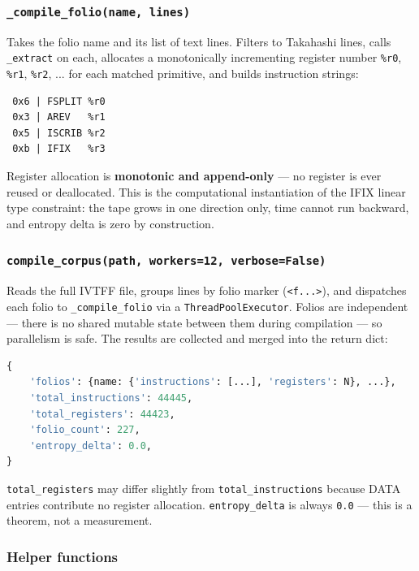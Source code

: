 \documentclass[12pt,a4paper]{article}
\begin{document}
\subsubsection{\texttt{\_compile\_folio(name, lines)}}

Takes the folio name and its list of text lines. Filters to Takahashi lines, calls \texttt{\_extract} on each, allocates a monotonically incrementing register number \texttt{\%r0}, \texttt{\%r1}, \texttt{\%r2}, ... for each matched primitive, and builds instruction strings:

\begin{lstlisting}
 0x6 | FSPLIT %r0
 0x3 | AREV   %r1
 0x5 | ISCRIB %r2
 0xb | IFIX   %r3
\end{lstlisting}

Register allocation is \textbf{monotonic and append-only} --- no register is ever reused or deallocated. This is the computational instantiation of the IFIX linear type constraint: the tape grows in one direction only, time cannot run backward, and entropy delta is zero by construction.

\subsubsection{\texttt{compile\_corpus(path, workers=12, verbose=False)}}

Reads the full IVTFF file, groups lines by folio marker (\texttt{\textless{}f...\textgreater{}}), and dispatches each folio to \texttt{\_compile\_folio} via a \texttt{ThreadPoolExecutor}. Folios are independent --- there is no shared mutable state between them during compilation --- so parallelism is safe. The results are collected and merged into the return dict:

\begin{lstlisting}[language=Python]
{
    'folios': {name: {'instructions': [...], 'registers': N}, ...},
    'total_instructions': 44445,
    'total_registers': 44423,
    'folio_count': 227,
    'entropy_delta': 0.0,
}
\end{lstlisting}

\texttt{total\_registers} may differ slightly from \texttt{total\_instructions} because DATA entries contribute no register allocation. \texttt{entropy\_delta} is always \texttt{0.0} --- this is a theorem, not a measurement.

\subsubsection{Helper functions}
\end{document}
